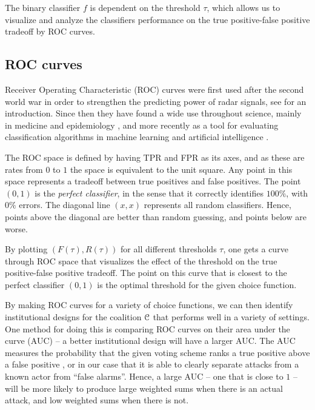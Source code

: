 The binary classifier $f$ is dependent on the threshold $\tau$, which allows us to visualize and analyze the classifiers performance on the true positive-false positive tradeoff by ROC curves. 

\subsection{ROC curves}
Receiver Operating Characteristic (ROC) curves were first used after the second world war in order to strengthen the predicting power of radar signals, see \parencite{Fawcett_2006} for an introduction. Since then they have found a wide use throughout science, mainly in medicine and epidemiology \parencite{Hanley-McNeil_1982}, and more recently as a tool for evaluating classification algorithms in machine learning and artificial intelligence \parencite{Bishop_2006, Bradley_1997}. 

The ROC space is defined by having TPR and FPR as its axes, and as these are rates from $0$ to $1$ the space is equivalent to the unit square. Any point in this space represents a tradeoff between true positives and false positives. The point $(0,1)$ is the \emph{perfect classifier}, in the sense that it correctly identifies $100\%$, with $0\%$ errors. The diagonal line $(x,x)$ represents all random classifiers. Hence, points above the diagonal are better than random guessing, and points below are worse. 

By plotting $(F(\tau), R(\tau))$ for all different thresholds $\tau$, one gets a curve through ROC space that visualizes the effect of the threshold on the true positive-false positive tradeoff. The point on this curve that is closest to the perfect classifier $(0,1)$ is the optimal threshold for the given choice function. 

By making ROC curves for a variety of choice functions, we can then identify institutional designs for the coalition $\EuScript{C}$ that performs well in a variety of settings. One method for doing this is comparing ROC curves on their area under the curve (AUC) -- a better institutional design will have a larger AUC. The AUC measures the probability that the given voting scheme ranks a true positive above a false positive \parencite{Hanley-McNeil_1982}, or in our case that it is able to clearly separate attacks from a known actor from ``false alarms''. Hence, a large AUC -- one that is close to $1$ -- will be more likely to produce large weighted sums when there is an actual attack, and low weighted sums when there is not. 

